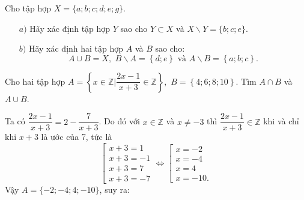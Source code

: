 \begin{bt}%
	Cho tập hợp $X = \{a; b; c; d; e; g\}.$
	\begin{itemize}
		\item [$a)$] Hãy xác định tập hợp $Y$ sao cho $Y\subset X$ và $X\backslash Y = \{b; c; e\}.$
		\item [$b)$]  Hãy xác định hai tập hợp $A$ và $B$ sao cho:
		\[
		A \cup B = X,\,\,B\backslash A = \left\{ d;e \right\}
		\,\,\text{và}\,\, A\backslash B = \left\{ a;b;c \right\}.
		\]
	\end{itemize}
\end{bt}
\begin{bt}%
	Cho hai tập hợp 
	$A = \left\{ {x \in \mathbb{Z}|\dfrac{{2x - 1}}{{x + 3}} \in \mathbb{Z}} \right\}, \,\,
	B = \left\{ {4; 6; 8; 10} \right\}.$
	Tìm $A\cap B$ và $A \cup B$.
\end{bt}
 Ta có $\dfrac{2x - 1}{x + 3} = 2 - \dfrac{7}{x + 3}$.
Do đó với $x\in\mathbb{Z}$ và $x\ne-3$ thì $\dfrac{2x - 1}{x + 3} \in \mathbb{Z}$ khi và chỉ khi
$x + 3$ là ước của 7, tức là
$$\left[ \begin{array}{l}
x + 3 = 1\\
x + 3 =  - 1\\
x + 3 = 7\\
x + 3 =  - 7
\end{array} \right. \Leftrightarrow \left[ \begin{array}{l}
x =  - 2\\
x =  - 4\\
x = 4\\
x =  - 10.
\end{array} \right.$$
Vậy $A = \{ - 2; - 4;4; - 10\} $, suy ra:
